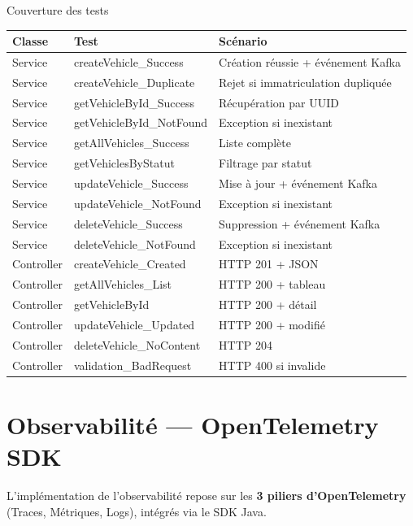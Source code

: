 \documentclass[12pt,a4paper]{report}
\begin{document}
\begin{adrbox}{Couverture des tests}
\begin{tabularx}{\textwidth}{l l X}
\toprule
\textbf{Classe} & \textbf{Test} & \textbf{Sc\'enario} \\
\midrule
Service & createVehicle\_Success & Cr\'eation r\'eussie + \'ev\'enement Kafka \\
Service & createVehicle\_Duplicate & Rejet si immatriculation dupliqu\'ee \\
Service & getVehicleById\_Success & R\'ecup\'eration par UUID \\
Service & getVehicleById\_NotFound & Exception si inexistant \\
Service & getAllVehicles\_Success & Liste compl\`ete \\
Service & getVehiclesByStatut & Filtrage par statut \\
Service & updateVehicle\_Success & Mise \`a jour + \'ev\'enement Kafka \\
Service & updateVehicle\_NotFound & Exception si inexistant \\
Service & deleteVehicle\_Success & Suppression + \'ev\'enement Kafka \\
Service & deleteVehicle\_NotFound & Exception si inexistant \\
\midrule
Controller & createVehicle\_Created & HTTP 201 + JSON \\
Controller & getAllVehicles\_List & HTTP 200 + tableau \\
Controller & getVehicleById & HTTP 200 + d\'etail \\
Controller & updateVehicle\_Updated & HTTP 200 + modifi\'e \\
Controller & deleteVehicle\_NoContent & HTTP 204 \\
Controller & validation\_BadRequest & HTTP 400 si invalide \\
\bottomrule
\end{tabularx}
\end{adrbox}

\chapter{Observabilit\'e --- OpenTelemetry SDK}

L'impl\'ementation de l'observabilit\'e repose sur les \textbf{3 piliers d'OpenTelemetry} (Traces, M\'etriques, Logs), int\'egr\'es via le SDK Java.
\end{document}
